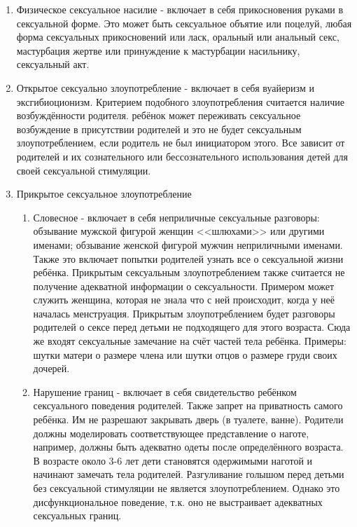 \documentclass[10pt, fleqn]{article}
\begin{document}
\begin{enumerate}
\item Физическое сексуальное насилие - включает в себя прикосновения руками в сексуальной форме. Это может быть сексуальное объятие или поцелуй, любая форма сексуальных прикосновений или ласк, оральный или анальный секс, мастурбация жертве или принуждение к мастурбации насильнику, сексуальный акт.

\item Открытое сексуально злоупотребление - включает в себя вуайеризм и эксгибиоционизм. Критерием подобного злоупотребления считается наличие возбуждённости родителя. ребёнок может переживать сексуальное возбуждение в присутствии родителей и это не будет сексуальным злоупотреблением, если родитель не был инициатором этого. Все зависит от родителей и их сознательного или бессознательного использования детей для своей сексуальной стимуляции.

\item Прикрытое сексуальное злоупотребление
\begin{enumerate}
\item Словесное - включает в себя неприличные сексуальные разговоры: обзывание мужской фигурой женщин <<шлюхами>> или другими именами; обзывание женской фигурой мужчин неприличными именами. Также это включает попытки родителей узнать все о сексуальной жизни ребёнка.
Прикрытым сексуальным злоупотреблением также считается не получение адекватной информации о сексуальности. Примером может служить женщина, которая не знала что с ней происходит, когда у неё началась менструация.
Прикрытым злоупотреблением будет разговоры родителей о сексе перед детьми не подходящего для этого возраста. Сюда же входят сексуальные замечание на счёт частей тела ребёнка. Примеры: шутки матери о размере члена или шутки отцов о размере груди своих дочерей.

\item Нарушение границ - включает в себя свидетельство ребёнком сексуального поведения родителей. Также запрет на приватность самого ребёнка. Им не разрешают закрывать дверь (в туалете, ванне). Родители должны моделировать соответствующее представление о наготе, например, должны быть адекватно одеты после определённого возраста. В возрасте около 3-6 лет дети становятся одержимыми наготой и начинают замечать тела родителей.
Разгуливание голышом перед детьми без сексуальной стимуляции не является злоупотреблением. Однако это дисфункциональное поведение, т.к. оно не выстраивает адекватных сексуальных границ.



\end{enumerate}
\end{enumerate}
\end{document}
